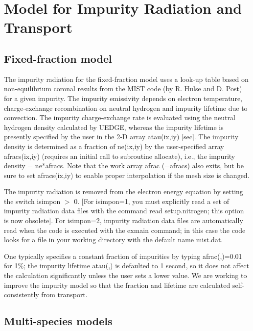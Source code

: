 \documentclass [12pt]{article}
\begin{document}
\section{Model for Impurity Radiation and Transport}
\subsection{Fixed-fraction model}

The impurity radiation for the fixed-fraction model uses a look-up
table based on non-equilibrium coronal results from the {\sf MIST}
code (by R. Hulse and D.  Post) for a given impurity.  The impurity
emissivity depends on electron temperature, charge-exchange
recombination on neutral hydrogen and impurity lifetime due to
convection.  The impurity charge-exchange rate is evaluated using the
neutral hydrogen density calculated by {\sf UEDGE}, whereas the
impurity lifetime is presently specified by the user in the 2-D array
{\sf atau(ix,iy)} [sec]. The impurity density is determined as a
fraction of {\sf ne(ix,iy)} by the user-specified array {\sf
afracs(ix,iy)} (requires an initial call to subroutine {\sf
allocate}), i.e., the impurity density = ne*afracs.  Note that the
work array {\sf afrac (=afracs)} also exits, but be sure to set {\sf
afracs(ix,iy)} to enable proper interpolation if the mesh size is changed.

The impurity radiation is removed from the electron energy equation by setting
the switch {\sf isimpon} $>$ 0.  [For isimpon=1, you must explicitly read a set
of impurity radiation data files with the command {\sf read setup.nitrogen};
this option is now obsolete].  For {\sf isimpon=2}, impurity radiation data
files are automatically read when the code is executed with the {\sf exmain}
command; in this case the code looks for a file in your working directory with
the default name {\sf mist.dat}.

One typically specifies a constant fraction of impurities by typing {\sf
  afrac(,)=0.01} for 1\%; the impurity lifetime {\sf atau(,)} is defaulted to
1 second, so it does not affect the calculation significantly unless the user
sets a lower value. We are working to improve the impurity model so that the
fraction and lifetime are calculated self-consistently from transport.

\subsection{Multi-species models}
\end{document}
